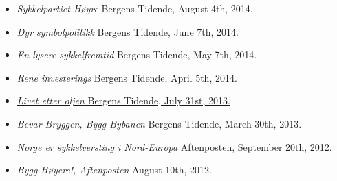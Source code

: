 \documentclass[margin]{res}
\begin{document}
\begin{resume}
\begin{itemize}
\item[] \emph {Sykkelpartiet H\o yre}  Bergens Tidende, August 4th, 2014.
\item[] \emph {Dyr symbolpolitikk}  Bergens Tidende, June 7th, 2014.
\item[] \emph {En lysere sykkelfremtid}  Bergens Tidende, May 7th, 2014.
\item[] \emph {Rene investerings}  Bergens Tidende, April 5th, 2014.
\item[] \href{http://www.nhh.no/Files/Filer/institutter/for/bedriftsøkonomisk_debatt/2013/mauritzen-livet_etter_oljen-bt-310713.pdf}{\emph {Livet etter oljen}  Bergens Tidende, July 31st, 2013.}
\item[] \emph {Bevar Bryggen, Bygg Bybanen}  Bergens Tidende, March 30th, 2013.
\item[] \emph {Norge er sykkelversting i Nord-Europa} Aftenposten, September 20th, 2012.
\item[] \emph {Bygg H\o yere!, Aftenposten} August 10th, 2012.
\end{itemize}




\end{resume}
\end{document}
